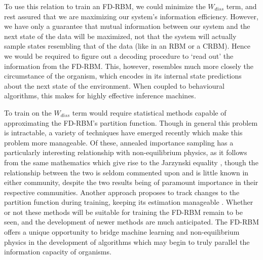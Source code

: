 \documentclass[11pt, oneside]{article}   	%
\begin{document}
To use this relation to train an FD-RBM, we could minimize the $W_{diss}$ term, and rest assured that we are maximizing our system's information efficiency.  However, we have only a guarantee that mutual information between our system and the next state of the data will be maximized, not that the system will actually sample states resembling that of the data (like in an RBM or a CRBM).  Hence we would be required to figure out a decoding procedure to `read out' the information from the FD-RBM.  This, however, resembles much more closely the circumstance of the organism, which encodes in its internal state predictions about the next state of the environment.  When coupled to behavioural algorithms, this makes for highly effective inference machines.

To train on the  $W_{diss}$ term would require statistical methods capable of approximating the FD-RBM's partition function.  Though in general this problem is intractable, a variety of techniques have emerged recently which make this problem more manageable.  Of these, annealed importance sampling \cite{AIS} has a particularly interesting relationship with non-equilibrium physics, as it follows from the same mathematics which give rise to the Jarzynski equality \cite{JE}, though the relationship between the two is seldom commented upon and is little known in either community, despite the two results being of paramount importance in their respective communities.  Another approach proposes to track changes to the partition function during training, keeping its estimation manageable \cite{trackingZ}.   Whether or not these methods will be suitable for training the FD-RBM remain to be seen, and the development of newer methods are much anticipated.  The FD-RBM offers a unique opportunity to bridge machine learning and non-equilibrium physics in the development of algorithms which may begin to truly parallel the information capacity of organisms.  



{}

\end{document}

